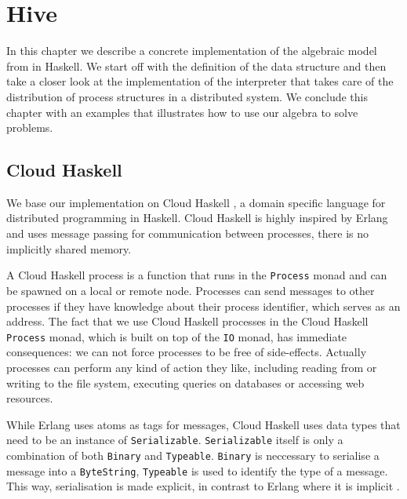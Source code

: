 \chapter{Hive}
In this chapter we describe a concrete implementation of the algebraic model from  in Haskell. We start off with the definition of the data structure and then take a closer look at the implementation of the interpreter that takes care of the distribution of process structures in a distributed system. We conclude this chapter with an examples that illustrates how to use our algebra to solve problems.

\section{Cloud Haskell}
We base our implementation on \textsf{Cloud Haskell} \cite{Epstein:2011:THC:2034675.2034690}, a domain specific language for distributed programming in Haskell. Cloud Haskell is highly inspired by Erlang and uses message passing for communication between processes, there is no implicitly shared memory.

A Cloud Haskell process is a function that runs in the \texttt{Process} monad and can be spawned on a local or remote node. Processes can send messages to other processes if they have knowledge about their process identifier, which serves as an address. The fact that we use \textsf{Cloud Haskell} processes in the \textsf{Cloud Haskell} \texttt{Process} monad, which is built on top of the \texttt{IO} monad, has immediate consequences: we can not force processes to be free of side-effects. Actually processes can perform any kind of action they like, including reading from or writing to the file system, executing queries on databases or accessing web resources.

While Erlang uses atoms as tags for messages, \textsf{Cloud Haskell} uses data types that need to be an instance of \texttt{Serializable}. \texttt{Serializable} itself is only a combination of both \texttt{Binary} and \texttt{Typeable}. \texttt{Binary} is neccessary to serialise a message into a \texttt{ByteString}, \texttt{Typeable} is used to identify the type of a message. This way, serialisation is made explicit, in contrast to Erlang where it is implicit \cite{Epstein:2011:THC:2034675.2034690}.

